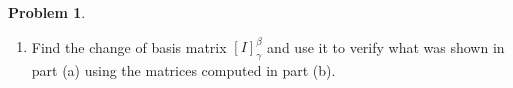 \documentclass[10pt]{article}
\theoremstyle{definition}
\newtheorem{problem}{Problem}
\begin{document}
\begin{problem}
\begin{enumerate}[label=(\alph*)]
$$\begin{pmatrix}
            1 & 1 \\
            1 & 0
          \end{pmatrix},
          \begin{pmatrix}
            1 & 3 \\
            2 & 3
          \end{pmatrix},
          \begin{pmatrix}
            2 & 6 \\
            1 & 4
          \end{pmatrix}\right\}.$$
  \item Find the change of basis matrix $\left[I\right]_\gamma^\beta$ and use it to verify what was shown in part (a) using the matrices computed in part (b).
\end{enumerate}
\end{problem}
\end{document}
